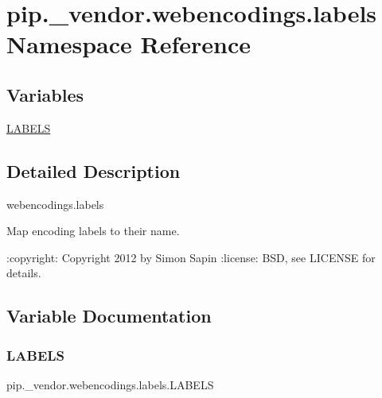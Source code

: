 \hypertarget{namespacepip_1_1__vendor_1_1webencodings_1_1labels}{}\section{pip.\+\_\+vendor.\+webencodings.\+labels Namespace Reference}
\label{namespacepip_1_1__vendor_1_1webencodings_1_1labels}
\subsection*{Variables}
\begin{DoxyCompactItemize}
\item 
\hyperlink{namespacepip_1_1__vendor_1_1webencodings_1_1labels_a033e015bf3b989a06092ec391338e817}{L\+A\+B\+E\+LS}
\end{DoxyCompactItemize}


\subsection{Detailed Description}
\begin{DoxyVerb}    webencodings.labels
    ~~~~~~~~~~~~~~~~~~~

    Map encoding labels to their name.

    :copyright: Copyright 2012 by Simon Sapin
    :license: BSD, see LICENSE for details.\end{DoxyVerb}
 

\subsection{Variable Documentation}
\mbox{\label{namespacepip_1_1__vendor_1_1webencodings_1_1labels_a033e015bf3b989a06092ec391338e817}} 
\subsubsection{\texorpdfstring{L\+A\+B\+E\+LS}{LABELS}}
{\footnotesize\ttfamily pip.\+\_\+vendor.\+webencodings.\+labels.\+L\+A\+B\+E\+LS}

